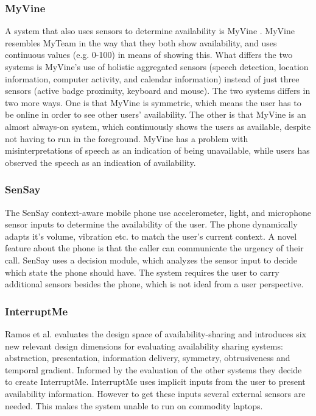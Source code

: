 \documentclass{sigchi}
\begin{document}
\subsubsection{MyVine}
A system that also uses sensors to determine availability is MyVine \cite{fogarty2004myvine}.
MyVine resembles MyTeam in the way that they both show availability, and uses continuous values (e.g. 0-100) in means of showing this.
What differs the two systems is MyVine's use of holistic aggregated sensors (speech detection, location information, computer activity, and calendar information) instead of just three sensors (active badge proximity, keyboard and mouse).
The two systems differs in two more ways.
One is that MyVine is symmetric, which means the user has to be online in order to see other users' availability.
The other is that MyVine is an almost always-on system, which continuously shows the users as available, despite not having to run in the foreground.
MyVine has a problem with misinterpretations of speech as an indication of being unavailable, while users has observed the speech as an indication of availability.

\subsubsection{SenSay}
The SenSay context-aware mobile phone \cite{siewiorek2003sensay} use accelerometer, light, and microphone sensor inputs to determine the availability of the user.
The phone dynamically adapts it's volume, vibration etc. to match the user's current context.
A novel feature about the phone is that the caller can communicate the urgency of their call.
SenSay uses a decision module, which analyzes the sensor input to decide which state the phone should have.
The system requires the user to carry additional sensors besides the phone, which is not ideal from a user perspective.

\subsubsection{InterruptMe}
Ramos et al. \cite{hincapie2011design} evaluates the design space of availability-sharing and introduces six new relevant design dimensions for evaluating availability sharing systems: abstraction, presentation, information delivery, symmetry, obtrusiveness and temporal gradient.
Informed by the evaluation of the other systems they decide to create InterruptMe.
InterruptMe uses implicit inputs from the user to present availability information.
However to get these inputs several external sensors are needed.
This makes the system unable to run on commodity laptops.
\end{document}
